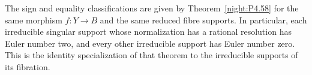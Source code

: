 \begin{remark}\hypertarget{tag-02Y1}{}\label{night:P4.9}\label{stmt:P4.9}

The sign and equality classifications are given by Theorem~\ref{night:P4.58}
for the same morphism $f:Y\to B$ and the same reduced fibre supports.
In particular, each irreducible singular support whose normalization has
a rational resolution has Euler number two, and every other irreducible
support has Euler number zero. This is the identity specialization of
that theorem to the irreducible supports of its fibration.
\end{remark}
